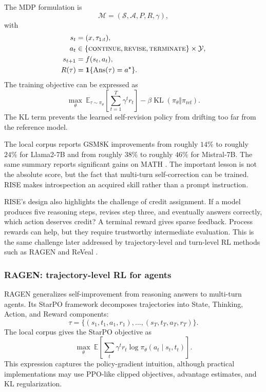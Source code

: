 The MDP formulation is
\begin{equation}
    \mathcal{M}=(\mathcal{S},\mathcal{A},P,R,\gamma),
\end{equation}
with
\begin{align}
    s_t &= (x,\tau_{1:t}),\\
    a_t &\in \{\textsc{continue},\textsc{revise},\textsc{terminate}\}\times\mathcal{Y},\\
    s_{t+1} &= f(s_t,a_t),\\
    R(\tau) &= \mathbf{1}\{\operatorname{Ans}(\tau)=a^\star\}.
\end{align}
The training objective can be expressed as
\begin{equation}
    \max_\theta\ \mathbb{E}_{\tau\sim\pi_\theta}\left[\sum_{t=1}^{T}\gamma^t r_t\right]
    -\beta\operatorname{KL}(\pi_\theta\Vert\pi_{\mathrm{ref}}).
    \label{eq:rise-objective}
\end{equation}
The KL term prevents the learned self-revision policy from drifting too far from the reference model.

The local corpus reports GSM8K \cite{gsm8k2021} improvements from roughly $14\%$ to roughly $24\%$ for Llama2-7B and from roughly $38\%$ to roughly $46\%$ for Mistral-7B. The same summary reports significant gains on MATH \cite{math2021}. The important lesson is not the absolute score, but the fact that multi-turn self-correction can be trained. RISE makes introspection an acquired skill rather than a prompt instruction.

RISE's design also highlights the challenge of credit assignment. If a model produces five reasoning steps, revises step three, and eventually answers correctly, which action deserves credit? A terminal reward gives sparse feedback. Process rewards can help, but they require trustworthy intermediate evaluation. This is the same challenge later addressed by trajectory-level and turn-level RL methods such as RAGEN \cite{wang2025ragen} and ReVeal \cite{jin2025reveal}.

\subsubsection{RAGEN: trajectory-level RL for agents}
\label{subsubsec:ragen}

RAGEN \cite{wang2025ragen} generalizes self-improvement from reasoning answers to multi-turn agents. Its StarPO framework decomposes trajectories into State, Thinking, Action, and Reward components:
\begin{equation}
    \tau=\{(s_1,t_1,a_1,r_1),\ldots,(s_T,t_T,a_T,r_T)\}.
\end{equation}
The local corpus gives the StarPO objective as
\begin{equation}
    \max_\theta\ \mathbb{E}\left[\sum_t \gamma^t r_t\log \pi_\theta(a_t\mid s_t,t_t)\right].
    \label{eq:starpo}
\end{equation}
This expression captures the policy-gradient intuition, although practical implementations may use PPO-like clipped objectives, advantage estimates, and KL regularization.

